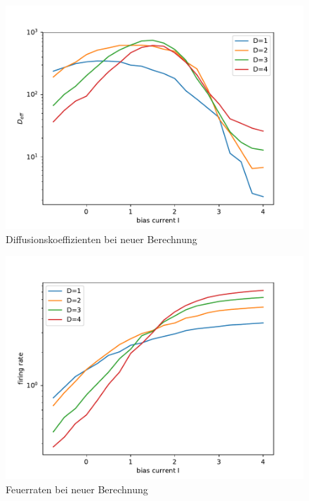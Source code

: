 \documentclass[12pt,a4paper]{article}
\begin{document}
\begin{figure}[H]
	\centering
	\includegraphics[scale=0.9]{dneur.pdf} 
	\caption{Diffusionskoeffizienten bei neuer Berechnung}
	\label{dn}
\end{figure} 
\begin{figure}[H]
	\centering
	\includegraphics[scale=0.9]{gneur.pdf} 
	\caption{Feuerraten bei neuer Berechnung}
	\label{gn}
\end{figure} 
\end{document}
